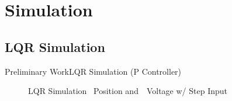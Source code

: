 \documentclass{beamer}
\begin{document}

\section{Simulation}

\subsection{LQR Simulation}

\begin{frame}{Preliminary Work}{LQR Simulation (P Controller)}
    \begin{figure}
      \centering
      \caption{LQR Simulation ~Position and~~Voltage w/ Step Input}
      \label{fig:LQR_Sim_Con}
    \end{figure}
\end{frame}
\end{document}
